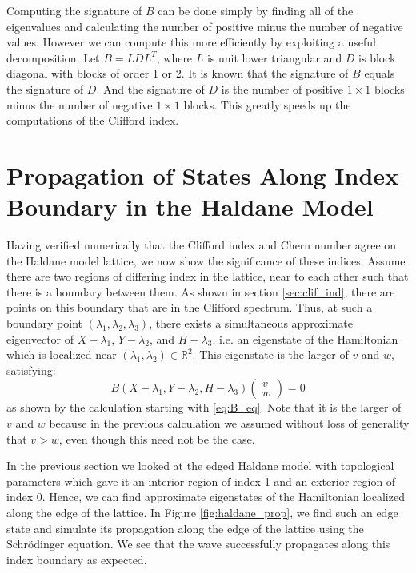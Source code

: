 \documentclass[a4paper]{article}
\begin{document}
Computing the signature of $B$ can be done simply by finding all of the eigenvalues and calculating the number of positive minus the number of negative values.
However we can compute this more efficiently by exploiting a useful decomposition.
Let $B = LDL^T$, where $L$ is unit lower triangular and $D$ is block diagonal with blocks of order 1 or 2.
It is known \cite{bunch1977some} that the signature of $B$ equals the signature of $D$.
And the signature of $D$ is the number of positive $1 \times 1$ blocks minus the number of negative $1 \times 1$ blocks.
This greatly speeds up the computations of the Clifford index.

\section{Propagation of States Along Index Boundary in the Haldane Model}

Having verified numerically that the Clifford index and Chern number agree on the Haldane model lattice, we now show the significance of these indices.
Assume there are two regions of differing index in the lattice, near to each other such that there is a boundary between them.
As shown in section \ref{sec:clif_ind}, there are points on this boundary that are in the Clifford spectrum.
Thus, at such a boundary point $(\lambda_1,\lambda_2,\lambda_3)$, there exists a simultaneous approximate eigenvector of $X-\lambda_1$, $Y-\lambda_2$, and $H-\lambda_3$, i.e. an eigenstate of the Hamiltonian which is localized near $(\lambda_1,\lambda_2) \in \mathbb{R}^2$.
This eigenstate is the larger of $v$ and $w$, satisfying:
\begin{equation}
B(X-\lambda_1,Y-\lambda_2,H-\lambda_3) \begin{pmatrix}v\\w\end{pmatrix} = 0
\end{equation}
as shown by the calculation starting with \eqref{eq:B_eq}.
Note that it is the larger of $v$ and $w$ because in the previous calculation we assumed without loss of generality that $v > w$, even though this need not be the case.
 
In the previous section we looked at the edged Haldane model with topological parameters which gave it an interior region of index 1 and an exterior region of index 0.
Hence, we can find approximate eigenstates of the Hamiltonian localized along the edge of the lattice.
In Figure \ref{fig:haldane_prop}, we find such an edge state and simulate its propagation along the edge of the lattice using the Schr{\"o}dinger equation.
We see that the wave successfully propagates along this index boundary as expected.
\end{document}
